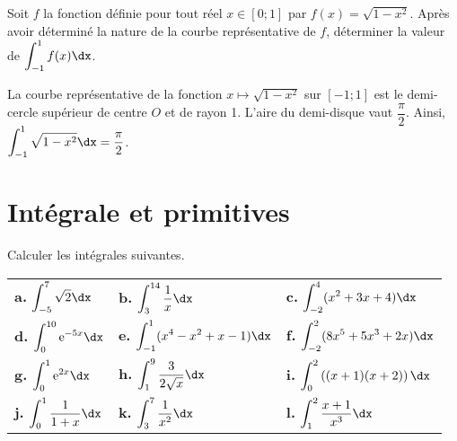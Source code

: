 \documentclass[11pt,fleqn, openany]{book} %
\begin{document}
\begin{exercise}Soit $f$ la fonction définie pour tout réel $x \in [0;1]$ par $f(x)=\sqrt{1-x^2}$. Après avoir déterminé la nature de la courbe représentative de $f$, déterminer la valeur de $\displaystyle\int_{-1}^1 f(x)\dx$.\end{exercise}

\begin{solution}

La courbe représentative de la fonction $x\mapsto \sqrt{1-x^2}$ sur $[-1;1]$ est le demi-cercle supérieur de centre $O$ et de rayon 1. L'aire du demi-disque vaut $\dfrac{\pi}{2}$. Ainsi, $\displaystyle\int_{-1}^1  \sqrt{1-x^2}\dx=\dfrac{\pi}{2}$.
\begin{center}
\end{center}



\end{solution}




\section*{Intégrale et primitives}



 \begin{exercise}Calculer les intégrales suivantes.  \renewcommand{\arraystretch}{2.5}
 \vspace{-0.5cm}
 \begin{center}
 \begin{tabularx}{\linewidth}{XXX}
 \textbf{a.} $\displaystyle\int_{-5}^{7} \sqrt{2} \dx$ &
 \textbf{b.} $\displaystyle\int_{3}^{14} \dfrac{1}{x} \dx$&
 \textbf{c.} $\displaystyle\int_{-2}^4 (x^2+3x+4) \dx$ \\
 \textbf{d.} $\displaystyle\int_{0}^{10} \e^{-5x} \dx$ &
 \textbf{e.}  $\displaystyle\int_{-1}^{1} (x^4-x^2+x-1) \dx$&
 \textbf{f.}    $\displaystyle\int_{-2}^{2} (8x^5+5x^3+2x) \dx$\\
 \textbf{g.} $\displaystyle\int_{0}^1 \e^{2x} \dx$&
  
 \textbf{h.} $\displaystyle\int_{1}^{9} \dfrac{3}{2\sqrt{x}} \dx$ &
 \textbf{i.} $\displaystyle\int_{0}^{2} \left((x+1)(x+2)\right) \dx$ \\
 \textbf{j.} $\displaystyle\int_{0}^{1} \dfrac{1}{1+x} \dx$ & \textbf{k.} $\displaystyle\int_3^7 \dfrac{1}{x^2}\dx$ & \textbf{l.} $\displaystyle\int_1^2 \dfrac{x+1}{x^3}\dx$
 \end{tabularx}\end{center}\end{exercise}
\end{document}
